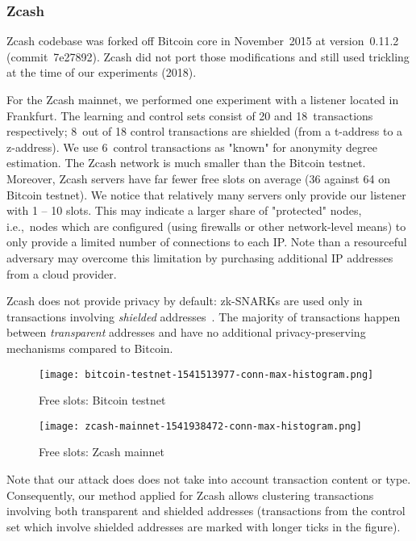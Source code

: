 \subsubsection{Zcash}

Zcash codebase was forked off Bitcoin core in November~2015 at version~0.11.2 (commit~7e27892).
Zcash did not port those modifications and still used trickling at the time of our experiments (2018).

For the Zcash mainnet, we performed one experiment with a listener located in Frankfurt.
The learning and control sets consist of 20 and 18~transactions respectively; 8~out of 18 control transactions are shielded (from a t-address to a z-address).
We use 6~control transactions as "known" for anonymity degree estimation.
The Zcash network is much smaller than the Bitcoin testnet.
Moreover, Zcash servers have far fewer free slots on average (36 against 64 on Bitcoin testnet).
We notice that relatively many servers only provide our listener with 1 -- 10 slots.
This may indicate a larger share of "protected" nodes, i.e.,~nodes which are configured (using firewalls or other network-level means) to only provide a limited number of connections to each IP.
Note than a resourceful adversary may overcome this limitation by purchasing additional IP addresses from a cloud provider.

Zcash does not provide privacy by default: zk-SNARKs are used only in transactions involving \textit{shielded} addresses~\cite{Kappos2018}.
The majority of transactions happen between \textit{transparent} addresses and have no additional privacy-preserving mechanisms compared to Bitcoin.

\begin{figure*}
	\centering
	\begin{minipage}{0.5\textwidth}
		\centering
		\texttt{[image: bitcoin-testnet-1541513977-conn-max-histogram.png]}
		\caption{Free slots: Bitcoin testnet}
	\end{minipage}\hfill
	\begin{minipage}{0.5\textwidth}
		\centering
		\texttt{[image: zcash-mainnet-1541938472-conn-max-histogram.png]}
		\caption{Free slots: Zcash mainnet}
	\end{minipage}\hfill
	\label{fig:free-slots}
\end{figure*}

Note that our attack does does not take into account transaction content or type.
Consequently, our method applied for Zcash allows clustering transactions involving both transparent and shielded addresses (transactions from the control set which involve shielded addresses are marked with longer ticks in the figure).


